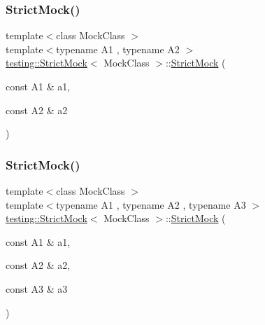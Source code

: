 \subsubsection{\texorpdfstring{StrictMock()}{StrictMock()}\hspace{0.1cm}{\footnotesize\ttfamily [3/11]}}
{\footnotesize\ttfamily template$<$class Mock\+Class $>$ \\
template$<$typename A1 , typename A2 $>$ \\
\mbox{\hyperlink{classtesting_1_1StrictMock}{testing\+::\+Strict\+Mock}}$<$ Mock\+Class $>$\+::\mbox{\hyperlink{classtesting_1_1StrictMock}{Strict\+Mock}} (\begin{DoxyParamCaption}\item[{const A1 \&}]{a1,  }\item[{const A2 \&}]{a2 }\end{DoxyParamCaption})\hspace{0.3cm}{\ttfamily [inline]}}

\mbox{\label{classtesting_1_1StrictMock_acc25729cd85a3a412106863894a30fe7}} 
\subsubsection{\texorpdfstring{StrictMock()}{StrictMock()}\hspace{0.1cm}{\footnotesize\ttfamily [4/11]}}
{\footnotesize\ttfamily template$<$class Mock\+Class $>$ \\
template$<$typename A1 , typename A2 , typename A3 $>$ \\
\mbox{\hyperlink{classtesting_1_1StrictMock}{testing\+::\+Strict\+Mock}}$<$ Mock\+Class $>$\+::\mbox{\hyperlink{classtesting_1_1StrictMock}{Strict\+Mock}} (\begin{DoxyParamCaption}\item[{const A1 \&}]{a1,  }\item[{const A2 \&}]{a2,  }\item[{const A3 \&}]{a3 }\end{DoxyParamCaption})\hspace{0.3cm}{\ttfamily [inline]}}

\mbox{\label{classtesting_1_1StrictMock_a6b42ef1460901ea91a2a09f44ae8fba2}} 
